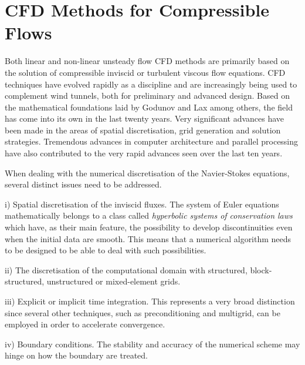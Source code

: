 %
%
%
%
%
\section{CFD Methods for Compressible Flows}
\label{CFD_section}
%
 Both linear and non-linear unsteady flow CFD methods
 are primarily based on the solution of compressible
 inviscid or turbulent viscous flow equations.
 CFD techniques have evolved rapidly as a discipline
 and are increasingly being used to complement wind tunnels,
 both for preliminary and advanced design.
 Based on the mathematical foundations laid by Godunov \citeyear{Godunov:1} and
 Lax \citeyear{Lax:1} among others, the field has come into its own in the
 last twenty years.
 Very significant advances have been made in the areas of spatial discretisation,
 grid generation and solution strategies. Tremendous advances in computer 
 architecture and parallel processing have also contributed to the very
 rapid advances seen over the last ten years.

 When dealing with the numerical discretisation of the Navier-Stokes equations,
 several distinct issues need to be addressed. 

 i) Spatial discretisation of the inviscid fluxes.
 The system of Euler equations mathematically
 belongs to a class called {\em hyperbolic systems of conservation laws} which
 have, as their main feature, the possibility to develop discontinuities even
 when the initial data are smooth.
 This means that a numerical algorithm needs to be designed to be able to deal with
 such possibilities.

 ii) The discretisation of the computational domain with
 structured, block-structured, unstructured or mixed-element grids.

 iii) Explicit or implicit time integration.
 This represents a very broad distinction since
 several other techniques, such as preconditioning and multigrid, can be
 employed in order to accelerate convergence. 

 iv) Boundary conditions. The stability and accuracy of the numerical scheme
 may hinge on how the boundary are treated.
%
%
%
